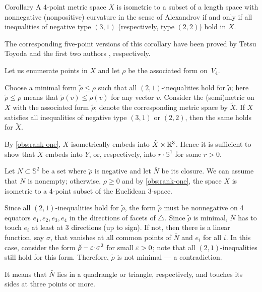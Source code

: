 \documentclass[a4paper,10pt]{article}
\begin{document}
\begin{thm}{Corollary}\label{cor:Four-point arrays}
A 4-point metric space $X$ is isometric to a subset of a length space with nonnegative (nonpositive) curvature in the sense of Alexandrov if and only if all inequalities of negative type $(3, 1)$ (respectively, type $(2, 2)$) hold in $X$.
\end{thm}

The corresponding five-point versions of this corollary have been proved by Tetsu Toyoda \cite{toyoda,lebedeva-petrunin2021} and the first two authors \cite{lebedeva-petrunin-2024}, respectively.

Let us enumerate points in $X$ and let $\rho$ be the associated form on~$V_4$.

Choose a minimal form $\tilde\rho\le \rho$ such that all $(2,1)$-inequalities hold for $\tilde\rho$;
here $\tilde\rho\le \rho$ means that $\tilde\rho(v)\le \rho(v)$ for any vector $v$.
Consider the (semi)metric on $X$ with the associated form $\tilde\rho$;
denote the corresponding metric space by $\tilde X$.
If $X$ satisfies all inequalities of negative type $(3, 1)$ or $(2,2)$, then the same holds for $\tilde X$.

By \ref{obs:rank-one}, $X$ isometrically embeds into $\tilde X\times \mathbb{R}^3$.
Hence it is sufficient to show that $\tilde X$ embeds into $Y$, or, respectively, into $r\cdot \mathbb{S}^1$ for some $r>0$.

Let $N\subset \mathbb{S}^2$ be a set where $\tilde\rho$ is negative and let $\bar N$ be its closure.
We can assume that $N$ is nonempty; otherwise,
$\rho\ge 0$ and by \ref{obs:rank-one}, the space $X$ is isometric to a 4-point subset of the Euclidean 3-space.

Since all $(2,1)$-inequalities hold for $\tilde\rho$, the form $\tilde\rho$
must be nonnegative on 4 equators $e_1,e_2,e_3,e_4$ in the directions of facets of $\triangle$.
Since $\tilde\rho$ is minimal, $\bar N$ has to touch $e_i$ at least at 3 directions (up to sign). 
If not, then there is a linear function, say $\sigma$, that vanishes at all common points of $\bar N$ and $e_i$ for all $i$.
In this case, consider the form $\tilde\rho-\eps\cdot \sigma^2$ for small $\varepsilon>0$;
note that all $(2,1)$-inequalities still hold for this form.
Therefore, $\tilde\rho$ is not minimal --- a contradiction.

It means that $\bar N$ lies in a quadrangle or triangle, respectively, and touches its sides at three points or more.
\end{document}

